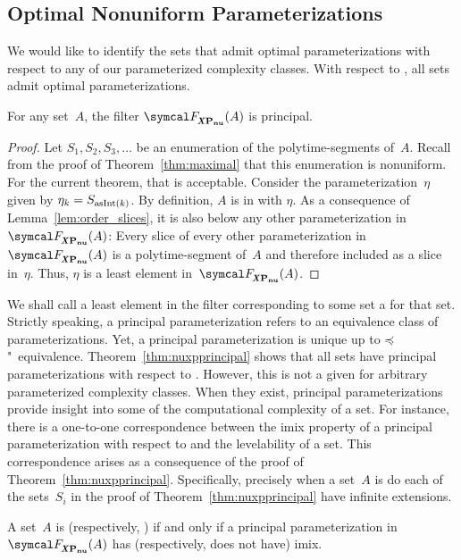 \subsection{Optimal Nonuniform Parameterizations}
\label{sec:tractability:optimalnu}%
We would like to identify the sets that admit optimal parameterizations with respect to any of our parameterized complexity classes.
With respect to , all sets admit optimal parameterizations.
\begin{theorem}
\label{thm:nuxpprincipal}%
  For any set~$A$, the filter $\calF_\clXnu{P}(A)$ is principal.
\end{theorem}
\begin{proof}
  Let $S_1, S_2, S_3, \ldots$ be an enumeration of the polytime-segments of~$A$.
  Recall from the proof of Theorem~\ref{thm:maximal} that this enumeration is nonuniform.
  For the current theorem, that is acceptable.
  Consider the parameterization~$\eta$ given by $\eta_k = S_{\operatorname{asInt}(k)}$.
  By definition, $A$ is in  with $\eta$.
  As a consequence of Lemma~\ref{lem:order_slices}, it is also below any other parameterization in~$\calF_\clXnu{P}(A)$:
  Every slice of every other parameterization in~$\calF_\clXnu{P}(A)$ is a polytime-segment of~$A$ and therefore included as a slice in~$\eta$.
  Thus, $\eta$ is a least element in~$\calF_\clXnu{P}(A)$.
\end{proof}

We shall call a least element in the filter corresponding to some set a  for that set.
Strictly speaking, a principal parameterization refers to an equivalence class of parameterizations.
Yet, a principal parameterization is unique up to $\preccurlyeq$"~equivalence.
Theorem~\ref{thm:nuxpprincipal} shows that all sets have principal parameterizations with respect to .
However, this is not a given for arbitrary parameterized complexity classes.
When they exist, principal parameterizations provide insight into some of the computational complexity of a set.
For instance, there is a one-to-one correspondence between the imix property of a principal parameterization with respect to  and the levelability of a set.
This correspondence arises as a consequence of the proof of Theorem~\ref{thm:nuxpprincipal}.
Specifically, precisely when a set~$A$ is  do each of the sets~$S_i$ in the proof of Theorem~\ref{thm:nuxpprincipal} have infinite extensions.
\begin{corollary}
  A set~$A$ is  (respectively, ) if and only if a principal parameterization in~$\calF_\clXnu{P}(A)$ has (respectively, does not have) imix.
\end{corollary}

